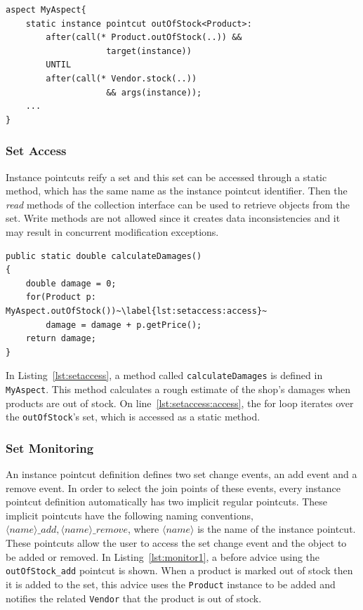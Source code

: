 \documentclass{acm_proc_article-sp}
\begin{document}
\begin{lstlisting}[float=h!, caption={An instance pointcut for out of stock products}, label={lst:usage}]
aspect MyAspect{
	static instance pointcut outOfStock<Product>: 
		after(call(* Product.outOfStock(..)) && 
					target(instance)) 
		UNTIL 
		after(call(* Vendor.stock(..)) 
					&& args(instance));
	...
}
\end{lstlisting}

\subsubsection{Set Access}
Instance pointcuts reify a set and this set can be accessed through a static method, which has the same name as the instance pointcut identifier. Then the \emph{read} methods of the collection interface can be used to retrieve objects from the set. Write methods are not allowed since it creates data inconsistencies and it may result in concurrent modification exceptions. 


\begin{lstlisting}[float=h!, caption={Calculate a damage estimate for out of stock products}, label={lst:setaccess}]
public static double calculateDamages()
{
	double damage = 0;
	for(Product p: MyAspect.outOfStock())~\label{lst:setaccess:access}~
		damage = damage + p.getPrice();
	return damage;
}
\end{lstlisting}

In Listing~\ref{lst:setaccess},  a method called \lstinline{calculateDamages} is defined in \lstinline{MyAspect}. This method calculates a rough estimate of the shop's damages when products are out of stock. On line~\ref{lst:setaccess:access}, the for loop iterates over the \lstinline{outOfStock}'s set, which is accessed as a static method.


\subsubsection{Set Monitoring}
An instance pointcut definition defines two set change events, an add event and a remove event. In order to select the join points of these events, every instance pointcut definition automatically has two implicit regular pointcuts. These implicit pointcuts have the following naming conventions, $\langle name \rangle\_add, \langle name \rangle\_remove$, where $\langle name \rangle$ is the name of the instance pointcut. These pointcuts allow the user to access the set change event and the object to be added or removed. In Listing~\ref{lst:monitor1}, a before advice using the \lstinline{outOfStock_add} pointcut is shown. When a product is marked out of stock then it is added to the set, this advice uses the \lstinline{Product} instance to be added and notifies the related \lstinline{Vendor} that the product is out of stock.
\end{document}
